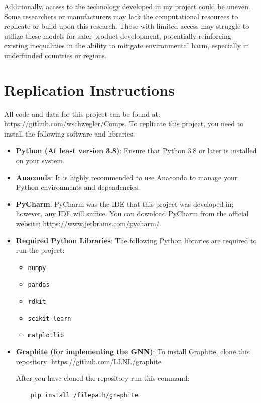 \documentclass[10pt,twocolumn]{article}
\begin{document}
Additionally, access to the technology developed in my project could be uneven. Some researchers or manufacturers may lack the computational resources to replicate or build upon this research. Those with limited access may struggle to utilize these models for safer product development, potentially reinforcing existing inequalities in the ability to mitigate environmental harm, especially in underfunded countries or regions.




\appendix
\section*{Replication Instructions}

All code and data for this project can be found at: https://github.com/wschwegler/Comps. To replicate this project, you need to install the following software and libraries:

\begin{itemize}
    \item \textbf{Python (At least version 3.8)}: Ensure that Python 3.8 or later is installed on your system. 
    
    \item \textbf{Anaconda}: It is highly recommended to use Anaconda to manage your Python environments and dependencies. 
    
    \item \textbf{PyCharm}: PyCharm was the IDE that this project was developed in; however, any IDE will suffice. You can download PyCharm from the official website: \url{https://www.jetbrains.com/pycharm/}.
    
    \item \textbf{Required Python Libraries}: The following Python libraries are required to run the project:
    \begin{itemize}
        \item \texttt{numpy}
        \item \texttt{pandas}
        \item \texttt{rdkit}
        \item \texttt{scikit-learn}
        \item \texttt{matplotlib}
    \end{itemize}
    
    \item \textbf{Graphite (for implementing the GNN)}: To install Graphite, clone this repository: https://github.com/LLNL/graphite

    After you have cloned the repository run this command:
    \begin{verbatim}
    pip install /filepath/graphite
    \end{verbatim}
\end{itemize}
\end{document}

